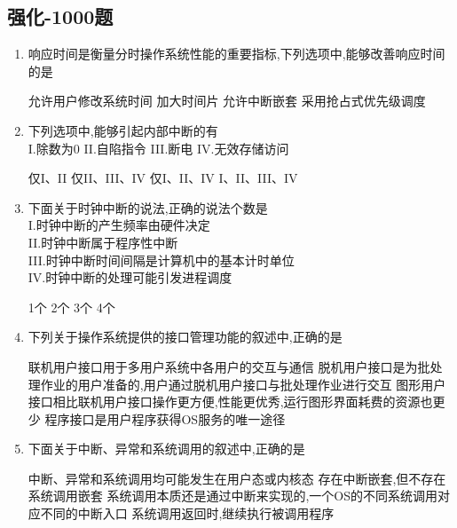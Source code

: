 \documentclass[12pt, a4paper, oneside, UTF8]{ctexbook}
\begin{document}
\subsection{强化-1000题}
\begin{enumerate}
    \item 响应时间是衡量分时操作系统性能的重要指标,下列选项中,能够改善响应时间的是
    \begin{choices}[1]
    \task 允许用户修改系统时间
    \task 加大时间片
    \task 允许中断嵌套
    \task 采用抢占式优先级调度
    \end{choices}

    \item 下列选项中,能够引起内部中断的有\\
    I.除数为0\quad
    II.自陷指令\quad
    III.断电\quad
    IV.无效存储访问
    \begin{choices}[2]
    \task 仅I、II
    \task 仅II、III、IV
    \task 仅I、II、IV
    \task I、II、III、IV
    \end{choices}

    \item 下面关于时钟中断的说法,正确的说法个数是\\
    I.时钟中断的产生频率由硬件决定\\
    II.时钟中断属于程序性中断\\
    III.时钟中断时间间隔是计算机中的基本计时单位\\
    IV.时钟中断的处理可能引发进程调度
    \begin{choices}
    \task 1个
    \task 2个
    \task 3个
    \task 4个
    \end{choices}

    \item 下列关于操作系统提供的接口管理功能的叙述中,正确的是
    \begin{choices}[1]
    \task 联机用户接口用于多用户系统中各用户的交互与通信
    \task 脱机用户接口是为批处理作业的用户准备的,用户通过脱机用户接口与批处理作业进行交互
    \task 图形用户接口相比联机用户接口操作更方便,性能更优秀,运行图形界面耗费的资源也更少
    \task 程序接口是用户程序获得OS服务的唯一途径
    \end{choices}

    \item 下面关于中断、异常和系统调用的叙述中,正确的是
    \begin{choices}[1]
    \task 中断、异常和系统调用均可能发生在用户态或内核态
    \task 存在中断嵌套,但不存在系统调用嵌套
    \task 系统调用本质还是通过中断来实现的,一个OS的不同系统调用对应不同的中断入口
    \task 系统调用返回时,继续执行被调用程序
    \end{choices}


\end{enumerate}
\end{document}
